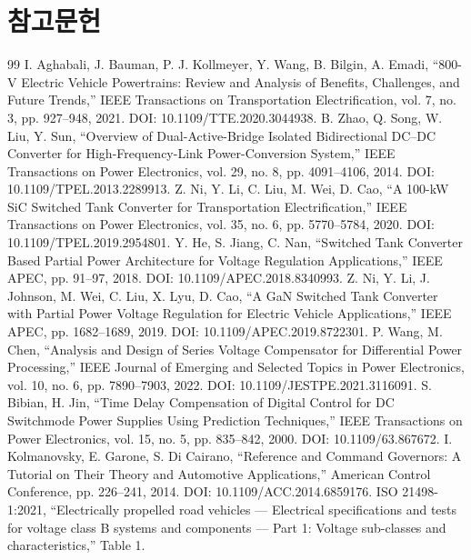 \chapter{참고문헌}
\begingroup\renewcommand{\chapter}[2]{}\begin{thebibliography}{99}
 I. Aghabali, J. Bauman, P. J. Kollmeyer, Y. Wang, B. Bilgin, A. Emadi, “800-V Electric Vehicle Powertrains: Review and Analysis of Benefits, Challenges, and Future Trends,” IEEE Transactions on Transportation Electrification, vol. 7, no. 3, pp. 927–948, 2021. DOI: 10.1109/TTE.2020.3044938.
 B. Zhao, Q. Song, W. Liu, Y. Sun, “Overview of Dual-Active-Bridge Isolated Bidirectional DC–DC Converter for High-Frequency-Link Power-Conversion System,” IEEE Transactions on Power Electronics, vol. 29, no. 8, pp. 4091–4106, 2014. DOI: 10.1109/TPEL.2013.2289913.
 Z. Ni, Y. Li, C. Liu, M. Wei, D. Cao, “A 100-kW SiC Switched Tank Converter for Transportation Electrification,” IEEE Transactions on Power Electronics, vol. 35, no. 6, pp. 5770–5784, 2020. DOI: 10.1109/TPEL.2019.2954801.
 Y. He, S. Jiang, C. Nan, “Switched Tank Converter Based Partial Power Architecture for Voltage Regulation Applications,” IEEE APEC, pp. 91–97, 2018. DOI: 10.1109/APEC.2018.8340993.
 Z. Ni, Y. Li, J. Johnson, M. Wei, C. Liu, X. Lyu, D. Cao, “A GaN Switched Tank Converter with Partial Power Voltage Regulation for Electric Vehicle Applications,” IEEE APEC, pp. 1682–1689, 2019. DOI: 10.1109/APEC.2019.8722301.
 P. Wang, M. Chen, “Analysis and Design of Series Voltage Compensator for Differential Power Processing,” IEEE Journal of Emerging and Selected Topics in Power Electronics, vol. 10, no. 6, pp. 7890–7903, 2022. DOI: 10.1109/JESTPE.2021.3116091.
 S. Bibian, H. Jin, “Time Delay Compensation of Digital Control for DC Switchmode Power Supplies Using Prediction Techniques,” IEEE Transactions on Power Electronics, vol. 15, no. 5, pp. 835–842, 2000. DOI: 10.1109/63.867672.
 I. Kolmanovsky, E. Garone, S. Di Cairano, “Reference and Command Governors: A Tutorial on Their Theory and Automotive Applications,” American Control Conference, pp. 226–241, 2014. DOI: 10.1109/ACC.2014.6859176.
 ISO 21498-1:2021, “Electrically propelled road vehicles — Electrical specifications and tests for voltage class B systems and components — Part 1: Voltage sub-classes and characteristics,” Table 1.

\end{thebibliography}

